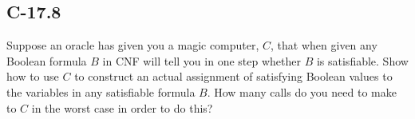 \documentclass[11pt]{article}
\begin{document}
\subsection{C-17.8}
Suppose an oracle has given you a magic computer, $C$, that when given any Boolean formula $B$ in CNF will tell you in one step whether $B$ is satisfiable. Show how to use $C$ to construct an actual assignment of satisfying Boolean values to the variables in any satisfiable formula $B$. How many calls do you need to make to $C$ in the worst case in order to do this?
\end{document}
